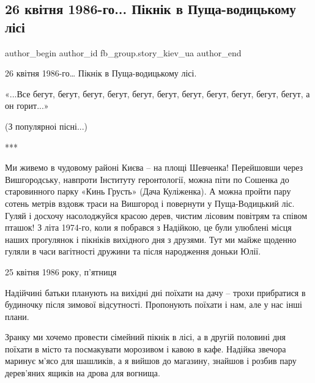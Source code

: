  
 
 
 
 
 
\subsection{26 квітня 1986-го... Пікнік в Пуща-водицькому лісі}
\label{sec:30_11_2021.fb.fb_group.story_kiev_ua.1.chaes_piknik_puscha_vodica}
 
\ifcmt
 author_begin
   author_id fb_group.story_kiev_ua
 author_end
\fi

26 квітня 1986-го… Пікнік в Пуща-водицькому лісі.

«...Все бегут, бегут, бегут, бегут, бегут, бегут, бегут, бегут, бегут, бегут, бегут, 
а он горит...»

(З популярноі пісні...)

***

Ми живемо в чудовому районі Києва – на площі Шевченка! Перейшовши через
Вишгородську, навпроти Інституту геронтології, можна піти по Сошенка до
старовинного парку «Кинь Грусть» (Дача Куліженка). А можна пройти пару сотень
метрів вздовж траси на Вишгород і повернути у Пуща-Водицький ліс. Гуляй і
досхочу насолоджуйся красою дерев, чистим лісовим повітрям та співом пташок! З
літа 1974-го, коли я побрався з Надійкою, це були улюблені місця наших
прогулянок і пікніків вихідного дня з друзями. Тут ми майже щоденно гуляли в
часи вагітності дружини та після народження доньки Юлії. 

25 квітня 1986 року, п’ятниця

Надійчині батьки планують на вихідні дні поїхати на дачу – трохи прибратися в
будиночку після зимової відсутності. Пропонують поїхати і нам, але у нас інші
плани.  

Зранку ми хочемо провести сімейний пікнік в лісі, а в другій половині дня
поїхати в місто та посмакувати морозивом і кавою в кафе. Надійка звечора
маринує м’ясо для шашликів, а я вийшов до магазину, знайшов і розбив пару
дерев’яних ящиків на дрова для вогнища. 

